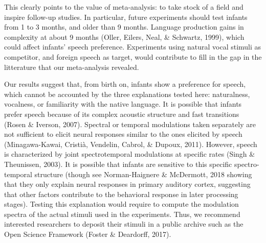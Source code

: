 \documentclass[
  english,
  man]{apa6}
\begin{document}
This clearly points to the value of meta-analysis: to take stock of a field and inspire follow-up studies. In particular, future experiments should test infants from 1 to 3 months, and older than 9 months. Language production gains in complexity at about 9 months (Oller, Eilers, Neal, \& Schwartz, 1999), which could affect infants' speech preference. Experiments using natural vocal stimuli as competitor, and foreign speech as target, would contribute to fill in the gap in the litterature that our meta-analysis revealed.

Our results suggest that, from birth on, infants show a preference for speech, which cannot be accounted by the three explanations tested here: naturalness, vocalness, or familiarity with the native language. It is possible that infants prefer speech because of its complex acoustic structure and fast transitions (Rosen \& Iverson, 2007). Spectral or temporal modulations taken separately are not sufficient to elicit neural responses similar to the ones elicited by speech (Minagawa-Kawai, Cristià, Vendelin, Cabrol, \& Dupoux, 2011). However, speech is characterized by joint spectrotemporal modulations at specific rates (Singh \& Theunissen, 2003). It is possible that infants are sensitive to this specific spectro-temporal structure (though see Norman-Haignere \& McDermott, 2018 showing that they only explain neural responses in primary auditory cortex, suggesting that other factors contribute to the behavioral response in later processing stages). Testing this explanation would require to compute the modulation spectra of the actual stimuli used in the experiments. Thus, we recommend interested researchers to deposit their stimuli in a public archive such as the Open Science Framework (Foster \& Deardorff, 2017).
\end{document}
